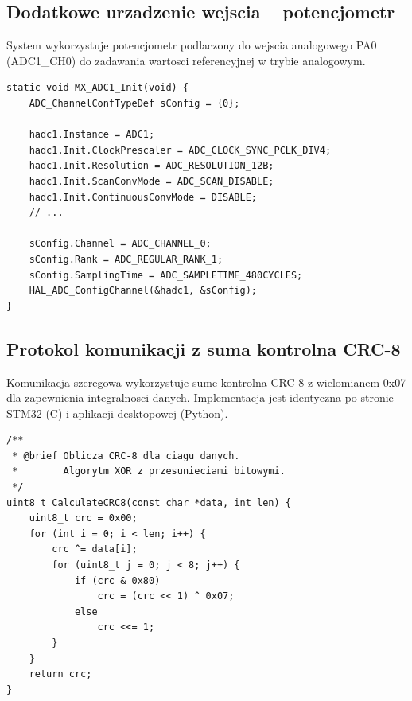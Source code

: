 \documentclass[11pt]{article}
\begin{document}
\begin{figure}[H]
    \centering
    \caption{}
\end{figure}

\subsection{Dodatkowe urzadzenie wejscia -- potencjometr}

System wykorzystuje potencjometr podlaczony do wejscia analogowego PA0 (ADC1\_CH0) do zadawania wartosci referencyjnej w trybie analogowym.

\begin{lstlisting}[caption={Konfiguracja ADC dla potencjometru (main.c)}, style=cstyle]
static void MX_ADC1_Init(void) {
    ADC_ChannelConfTypeDef sConfig = {0};
    
    hadc1.Instance = ADC1;
    hadc1.Init.ClockPrescaler = ADC_CLOCK_SYNC_PCLK_DIV4;
    hadc1.Init.Resolution = ADC_RESOLUTION_12B;
    hadc1.Init.ScanConvMode = ADC_SCAN_DISABLE;
    hadc1.Init.ContinuousConvMode = DISABLE;
    // ...
    
    sConfig.Channel = ADC_CHANNEL_0;
    sConfig.Rank = ADC_REGULAR_RANK_1;
    sConfig.SamplingTime = ADC_SAMPLETIME_480CYCLES;
    HAL_ADC_ConfigChannel(&hadc1, &sConfig);
}
\end{lstlisting}

\subsection{Protokol komunikacji z suma kontrolna CRC-8}

Komunikacja szeregowa wykorzystuje sume kontrolna CRC-8 z wielomianem 0x07 dla zapewnienia integralnosci danych. Implementacja jest identyczna po stronie STM32 (C) i aplikacji desktopowej (Python).

\begin{lstlisting}[caption={Implementacja CRC-8 (crc8.c)}, style=cstyle]
/**
 * @brief Oblicza CRC-8 dla ciagu danych.
 *        Algorytm XOR z przesunieciami bitowymi.
 */
uint8_t CalculateCRC8(const char *data, int len) {
    uint8_t crc = 0x00;
    for (int i = 0; i < len; i++) {
        crc ^= data[i];
        for (uint8_t j = 0; j < 8; j++) {
            if (crc & 0x80)
                crc = (crc << 1) ^ 0x07;
            else
                crc <<= 1;
        }
    }
    return crc;
}
\end{lstlisting}
\end{document}
